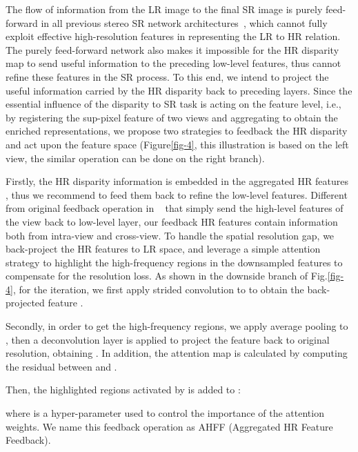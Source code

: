 \documentclass[sigconf]{acmart}
\begin{document}
The flow of information from the LR image to the final SR image is purely feed-forward in all previous stereo SR network architectures~\cite{Wang2019LearningPA, Wang2020ParallaxAF, Ying2020ASA, Song2020StereoscopicIS}, which cannot fully exploit effective high-resolution features in representing the LR to HR relation. The purely feed-forward network also makes it impossible for the HR disparity map to send useful information to the preceding low-level features, thus cannot refine these features in the SR process. To this end, we intend to project the useful information carried by the HR disparity back to preceding layers. Since the essential influence of the disparity to SR task is acting on the feature level, i.e., by registering the sup-pixel feature of two views and aggregating to obtain the enriched representations, we propose two strategies to feedback the HR disparity and act upon the feature space (Figure\ref{fig-4}, this illustration is based on the left view, the similar operation can be done on the right branch).

Firstly, the HR disparity information is embedded in the aggregated HR features , thus we recommend to feed them back to refine the low-level features. Different from original feedback operation in ~\cite{Li2019FeedbackNF} that simply send the high-level features of the view back to low-level layer, our feedback HR features contain information both from intra-view and cross-view. To handle the spatial resolution gap, we back-project the HR features to LR space, and leverage a simple attention strategy to highlight the high-frequency regions in the downsampled features to compensate for the resolution loss. As shown in the downside branch of Fig.\ref{fig-4}, for the  iteration, we first apply strided convolution to  to obtain the back-projected feature . 


Secondly, in order to get the high-frequency regions, we apply average pooling to , then a deconvolution layer is applied to project the feature back to original resolution, obtaining . In addition, the attention map  is calculated by computing the residual between  and .


Then, the highlighted regions activated by  is added to :

where  is a hyper-parameter used to control the importance of the attention weights. We name this feedback operation as AHFF (Aggregated HR Feature Feedback).
\end{document}
